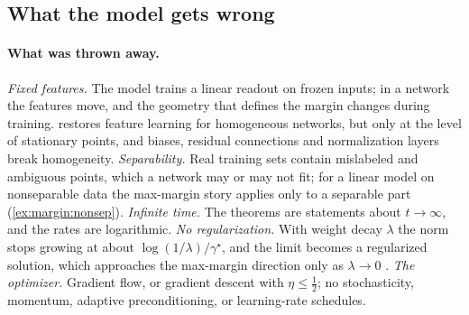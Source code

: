 \begin{refsection}
\section{What the model gets wrong}\label{sec:margin:wrong}

\paragraph{What was thrown away.} \emph{Fixed features.} The model trains a linear readout on frozen inputs; in a network the features move, and the geometry that defines the margin changes during training.  restores feature learning for homogeneous networks, but only at the level of stationary points, and biases, residual connections and normalization layers break homogeneity. \emph{Separability.} Real training sets contain mislabeled and ambiguous points, which a network may or may not fit; for a linear model on nonseparable data the max-margin story applies only to a separable part (\cref{ex:margin:nonsep}). \emph{Infinite time.} The theorems are statements about $t\to\infty$, and the rates are logarithmic. \emph{No regularization.} With weight decay $\lambda$ the norm stops growing at about $\log(1/\lambda)/\gamma^\star$, and the limit becomes a regularized solution, which approaches the max-margin direction only as $\lambda\to0$ \parencite{RossetZhuHastie2003,WeiEtAl2019}. \emph{The optimizer.} Gradient flow, or gradient descent with $\eta\le\frac12$; no stochasticity, momentum, adaptive preconditioning, or learning-rate schedules.


\end{refsection}
